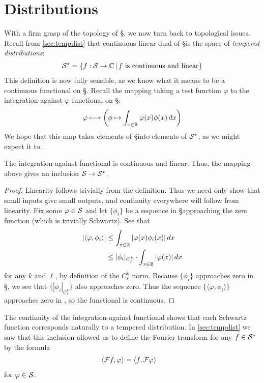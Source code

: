 
  \chapter{Distributions}
  \label{ch:dist}
  
  With a firm grasp of the topology of \S, we now turn back to topological issues.
  Recall from \cref{sec:tempdist} that continuous linear dual of \S is the space of \emph{tempered distributions}:
  \begin{align*}
    \S^* = \{f:\S\rightarrow\C\,\vert\,f\text{ is continuous and linear}\}
  \end{align*}
  This definition is now fully sensible, as we know what it means to be a continuous functional on \S.
  Recall the mapping taking a test function $\varphi$ to the integration-against-$\varphi$ functional on \S:
  \begin{align*}
    \varphi \longmapsto \left( \phi \mapsto \int_{x\in\R} \varphi(x) \phi(x)\,dx \right)
  \end{align*}
  We hope that this map takes elements of \S into elements of $\S^*$, as we might expect it to.
  \begin{thm}
    The integration-against functional is continuous and linear.
    Thus, the mapping above gives an inclusion $\S\rightarrow\S^*$.
  \end{thm}
  \begin{proof}
    Linearity follows trivially from the definition.
    Thus we need only show that small inputs give small outputs, and continuity everywhere will follow from linearity.
    Fix some $\varphi\in\S$ and let $\{\phi_i\}$ be a sequence in \S approaching the zero function (which is trivially Schwartz).
    See that
    \begin{align*}
      |\langle\varphi,\phi_i\rangle| 
      &\le \int_{x\in\R}| \varphi(x)\phi_i(x)|\,dx
      \\&\le |\phi_i|_{C^k_\ell}\cdot\int_{x\in\R}|\varphi(x)|\,dx
    \end{align*}
    for any $k$ and $\ell$, by definition of the $C^k_\ell$ norm.
    Because $\{\phi_i\}$ approaches zero in \S, we see that $\{|\phi_i|_{C^k_\ell}\}$ also approaches zero.
    Thus the sequence $\{\langle\varphi,\phi_i\rangle\}$ approaches zero in \C, so the functional is continuous.
  \end{proof}

  The continuity of the integration-against functional shows that each Schwartz function corresponds naturally to a tempered distribution.
  In \cref{sec:tempdist} we saw that this inclusion allowed us to define the Fourier transform for any $f\in\S^*$ by the formula
  \begin{align*}
    \langle\F f, \varphi\rangle &= \langle f, \F\varphi\rangle
  \end{align*}
  for $\varphi\in\S$.
  
